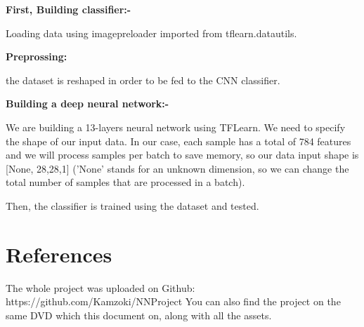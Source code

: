 \documentclass[10pt,twocolumn,letterpaper]{article}
\begin{document}
\textbf {First, Building classifier:- }

 Loading data using imagepreloader imported from tflearn.datautils.

 \textbf {Preprossing:}

 the dataset is reshaped in order to be fed to the CNN classifier.

\textbf {Building a deep neural network:-}

We are building a 13-layers neural network using TFLearn. We need to specify the shape of our input data. In our case, each sample has a total of 784 features and we will process samples per batch to save memory, so our data input shape is [None, 28,28,1] ('None' stands for an unknown dimension, so we can change the total number of samples that are processed in a batch).

Then, the classifier is trained using the dataset and tested.
\section{References}

The whole project was uploaded on Github: https://github.com/Kamzoki/NNProject
You can also find the project on the same DVD which this document on, along with all the assets.
\end{document}
